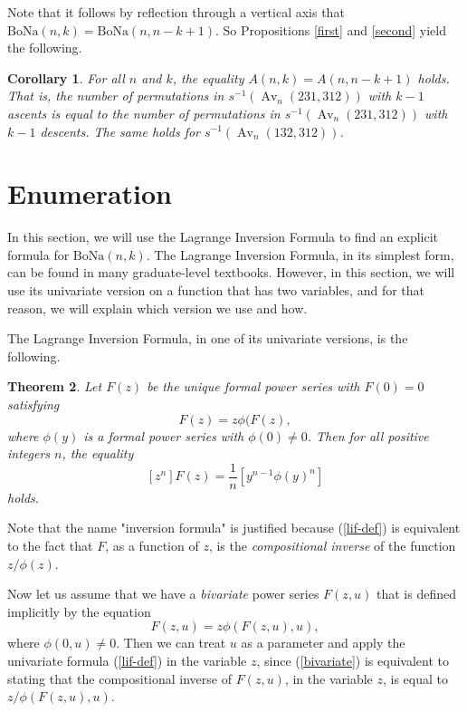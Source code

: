 \documentclass[11pt]{article}
\newcommand{\bona}{\mathrm{BoNa}}
\newcommand{\av}{\operatorname{Av}}
\newtheorem{theorem}{Theorem}[section]
\newtheorem{corollary}[theorem]{Corollary}
\begin{document}
Note that  it follows by reflection through a vertical axis that $\bona(n,k)=\bona(n,n-k+1)$. So Propositions \ref{first} and \ref{second} yield the following.

\begin{corollary}  \label{symmetry} For all $n$ and $k$, the equality $A(n,k)=A(n,n-k+1)$ holds. That is, 
the number of permutations in  $s^{-1}(\av_n(231,312))$ with $k-1$ ascents is equal to the number of permutations in  $s^{-1}(\av_n(231,312))$ with 
$k-1$ descents. The same holds for $s^{-1}(\av_n(132,312))$.
\end{corollary}

\section{Enumeration}  \label{enumeration}
In this section, we will use the Lagrange Inversion Formula to find an explicit formula for $\bona(n,k)$.  The Lagrange Inversion Formula, in its simplest form, 
can be found in many graduate-level textbooks. However, in this section, we will use its univariate version on a function that has two variables, and for that reason, 
we will explain which version we use and how. 

The Lagrange Inversion Formula, in one of its univariate versions, is the following. 
\begin{theorem} \label{lif}  Let 
$F(z)$ be the unique formal power series with
$F(0)=0$ satisfying 
\begin{equation} \label{lif-def} F(z)=z\phi(F(z),\end{equation}
where $\phi(y)$ is a formal power series with $\phi(0)\neq 0$. 
Then for all positive integers $n$, the equality
\[[z^n]F(z)=\frac{1}{n}[y^{n-1}\phi(y)^n] \] holds.
\end{theorem}

Note that the name "inversion formula" is justified because (\ref{lif-def}) is equivalent to the fact that $F$, as a function of $z$,  is the {\em compositional inverse} of
the function $z/ \phi(z)$. 

Now let us assume that we have a {\em bivariate} power series $F(z,u)$ that is defined implicitly by the equation
\begin{equation} \label{bivariate} F(z,u)=z\phi(F(z,u),u), \end{equation} where $\phi(0,u)\neq 0$.  
Then we can treat $u$ as a parameter and apply the univariate formula (\ref{lif-def}) in the variable $z$, since (\ref{bivariate}) is equivalent to stating that the compositional 
inverse of $F(z,u)$, in the variable $z$, is equal to $z/\phi(F(z,u),u)$.
\end{document}
